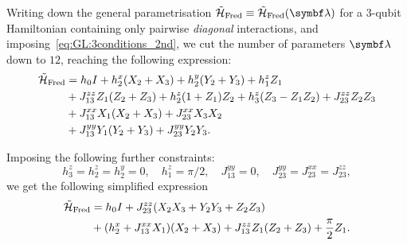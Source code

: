 Writing down the general parametrisation $\HTildeFred\equiv\HTildeFred(\bslambda)$ for a $3$-qubit Hamiltonian containing only pairwise \emph{diagonal} interactions,
and imposing~\cref{eq:GL:3conditions_2nd}, we cut the number of parameters $\bslambda$ down to $12$, reaching the following expression:
\begin{equation}
\begin{aligned}
    \tilde{{\mathcal{H}}}_{\operatorname{Fred}} &=
    h_0 I
    + h_2^x (X_2 + X_3)
    + h_2^y (Y_2 + Y_3)
    + h_1^z Z_1 \\
    &+ J_{13}^{zz} Z_1(Z_2 + Z_3)
    + h_2^z (1 + Z_1) Z_2
    + h_3^z (Z_3 - Z_1 Z_2)
    + J_{23}^{zz} Z_2 Z_3 \\
    &+ J_{13}^{xx} X_1(X_2 + X_3)
    + J_{23}^{xx} X_3 X_2 \\
    &+ J_{13}^{yy} Y_1 (Y_2 + Y_3)
    + J_{23}^{yy} Y_2 Y_3.
\end{aligned}
\end{equation}

Imposing the following further constraints:
\begin{equation}
    h_3^z = h_2^z = h_2^y = 0, \quad
    h_1^z = \pi/2, \quad
    J_{13}^{yy} = 0,\quad
    J_{23}^{yy} = J_{23}^{xx} = J_{23}^{zz},
\end{equation}
we get the following simplified expression
\begin{equation}
\begin{aligned}
    \tilde{{\mathcal{H}}}_{\operatorname{Fred}} &=
    h_0 I
    + J_{23}^{zz} (X_2 X_3 + Y_2 Y_3 + Z_2 Z_3) \\
    &+ (h_2^x + J_{13}^{xx} X_1)(X_2 + X_3)
    + J_{13}^{zz} Z_1 (Z_2 + Z_3)
    + \frac{\pi}{2}  Z_1.
\end{aligned}
\label{eq:GL:fredkin_ansatz_used_for_analytics}
\end{equation}

